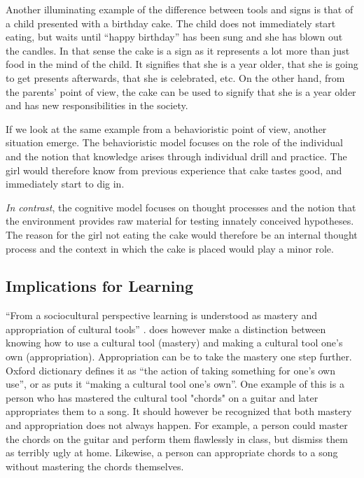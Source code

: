 Another illuminating example of the difference between tools and signs is that of a child presented with a birthday cake. The child does not immediately start eating, but waits until “happy birthday” has been sung and she has blown out the candles. In that sense the cake is a sign as it represents a lot more than just food in the mind of the child. It signifies that she is a year older, that she is going to get presents afterwards, that she is celebrated, etc. On the other hand, from the parents’ point of view, the cake can be used to signify that she is a year older and has new responsibilities in the society. 

If we look at the same example from a behavioristic point of view, another situation emerge. The behavioristic model focuses on the role of the individual and the notion that knowledge arises through individual drill and practice. The girl would therefore know from previous experience that cake tastes good, and immediately start to dig in. 

\emph{In contrast}, the cognitive model focuses on thought processes and the notion that the environment provides raw material for testing innately conceived hypotheses. The reason for the girl not eating the cake would therefore be an internal thought process and the context in which the cake is placed would play a minor role. 

\subsection{Implications for Learning}
“From a sociocultural perspective learning is understood as mastery and appropriation of cultural tools” \citetext{Wertsch, 1998, Säljö, 1999, 2001, cited in \citealp{mifsud2010reconsidering}}. \citet{wertsch1998mind} does however make a distinction between knowing how to use a cultural tool (mastery) and making a cultural tool one’s own (appropriation). Appropriation can be to take the mastery one step further. Oxford dictionary defines it as “the action of taking something for one’s own use”, or as \citet{wertsch1998mind} puts it “making a cultural tool one’s own”. One example of this is a person who has mastered the cultural tool "chords" on a guitar and later appropriates them to a song. It should however be recognized that both mastery and appropriation does not always happen. For example, a person could master the chords on the guitar and perform them flawlessly in class, but dismiss them as terribly ugly at home. Likewise, a person can appropriate chords to a song without mastering the chords themselves.

